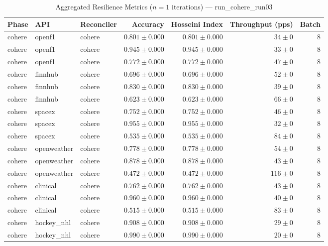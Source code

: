 
\begin{table}[htbp]
\caption{Aggregated Resilience Metrics ($n=1$ iterations) --- run_cohere_run03}
\begin{tabular}{l l l r r r r}
\hline
Phase & API & Reconciler & Accuracy & Hosseini Index & Throughput (pps) & Batch \\
\hline
cohere & openf1 & cohere & $0.801\pm0.000$ & $0.801\pm0.000$ & $34\pm0$ & 8 \\
cohere & openf1 & cohere & $0.945\pm0.000$ & $0.945\pm0.000$ & $33\pm0$ & 8 \\
cohere & openf1 & cohere & $0.772\pm0.000$ & $0.772\pm0.000$ & $47\pm0$ & 8 \\
cohere & finnhub & cohere & $0.696\pm0.000$ & $0.696\pm0.000$ & $52\pm0$ & 8 \\
cohere & finnhub & cohere & $0.830\pm0.000$ & $0.830\pm0.000$ & $39\pm0$ & 8 \\
cohere & finnhub & cohere & $0.623\pm0.000$ & $0.623\pm0.000$ & $66\pm0$ & 8 \\
cohere & spacex & cohere & $0.752\pm0.000$ & $0.752\pm0.000$ & $46\pm0$ & 8 \\
cohere & spacex & cohere & $0.955\pm0.000$ & $0.955\pm0.000$ & $32\pm0$ & 8 \\
cohere & spacex & cohere & $0.535\pm0.000$ & $0.535\pm0.000$ & $84\pm0$ & 8 \\
cohere & openweather & cohere & $0.778\pm0.000$ & $0.778\pm0.000$ & $54\pm0$ & 8 \\
cohere & openweather & cohere & $0.878\pm0.000$ & $0.878\pm0.000$ & $43\pm0$ & 8 \\
cohere & openweather & cohere & $0.472\pm0.000$ & $0.472\pm0.000$ & $116\pm0$ & 8 \\
cohere & clinical & cohere & $0.762\pm0.000$ & $0.762\pm0.000$ & $43\pm0$ & 8 \\
cohere & clinical & cohere & $0.960\pm0.000$ & $0.960\pm0.000$ & $40\pm0$ & 8 \\
cohere & clinical & cohere & $0.515\pm0.000$ & $0.515\pm0.000$ & $83\pm0$ & 8 \\
cohere & hockey\_nhl & cohere & $0.908\pm0.000$ & $0.908\pm0.000$ & $29\pm0$ & 8 \\
cohere & hockey\_nhl & cohere & $0.990\pm0.000$ & $0.990\pm0.000$ & $20\pm0$ & 8 \\

\end{tabular}
\end{table}
